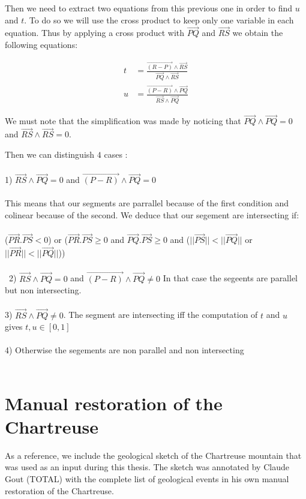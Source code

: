 \documentclass[12pt, a4paper]{report} %
\begin{document}
Then we need to extract two equations from this previous one in order to find $u$ and $t$.
To do so we will use the cross product to keep only one variable in each equation. Thus by applying a cross product with $\overrightarrow{PQ}$ and $\overrightarrow{RS}$ we obtain the following equations:

\begin{align}
	t &= \frac{\overrightarrow{(R - P)} \wedge \overrightarrow{RS}}{\overrightarrow{PQ} \wedge \overrightarrow{RS}}\\
	u &= \frac{\overrightarrow{(P - R)} \wedge \overrightarrow{PQ}}{\overrightarrow{RS} \wedge \overrightarrow{PQ}}
\end{align}

We must note that the simplification was made by noticing that $\overrightarrow{PQ} \wedge \overrightarrow{PQ} = 0$ and $\overrightarrow{RS} \wedge \overrightarrow{RS} = 0$.

Then we can distinguish $4$ cases :\\\\
1) $ \overrightarrow{RS} \wedge \overrightarrow{PQ} = 0$ and $\overrightarrow{(P - R)} \wedge \overrightarrow{PQ} = 0$\\\\
This means that our segments are parrallel because of the first condition and colinear because of the second. We deduce that our segement are intersecting if: \\\\ 
($\overrightarrow{PR}.\overrightarrow{PS} < 0$) or ($\overrightarrow{PR}.\overrightarrow{PS} \geq 0$ and $\overrightarrow{PQ}.\overrightarrow{PS} \geq 0$ and ($||\overrightarrow{PS}|| < ||\overrightarrow{PQ}||$ or $||\overrightarrow{PR}|| < ||\overrightarrow{PQ}||$))
\\\\\
2)  $ \overrightarrow{RS} \wedge \overrightarrow{PQ} = 0$ and $\overrightarrow{(P - R)} \wedge \overrightarrow{PQ} \neq 0$
In that case the segeents are parallel but non intersecting.\\\\
3)  $ \overrightarrow{RS} \wedge \overrightarrow{PQ} \neq 0$.
The segment are intersecting iff the computation of $t$ and $u$ gives $t,u \in [0,1]$\\\\
4) Otherwise the segements are non parallel and non intersecting\\\\

\section{Manual restoration of the Chartreuse}
As a reference, we include the geological sketch of the Chartreuse mountain that was used as an input during this thesis. The sketch was annotated by Claude Gout (TOTAL) with the complete list of geological events in his own manual restoration of the Chartreuse. 
\end{document}
